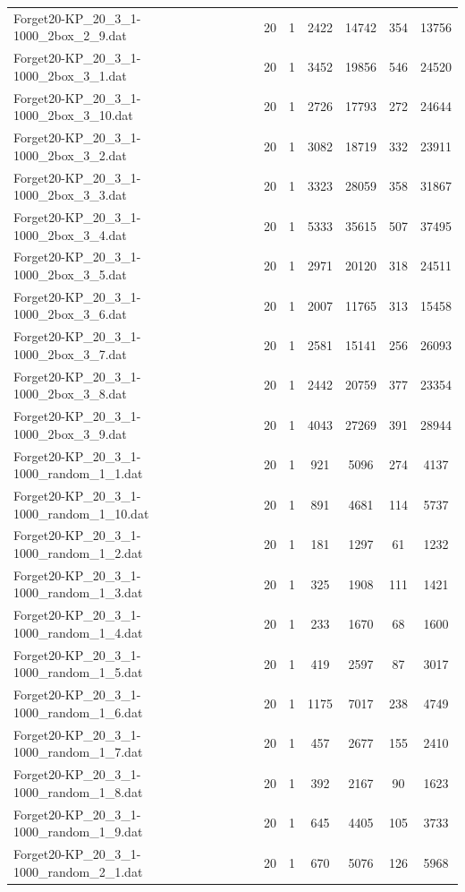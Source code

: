 \begin{table}[!ht]
\begin{tabular}{lcccccc}
Forget20-KP\_20\_3\_1-1000\_2box\_2\_9.dat & 20 & 1 & 2422 & 14742 & 354 & 13756 \\
Forget20-KP\_20\_3\_1-1000\_2box\_3\_1.dat & 20 & 1 & 3452 & 19856 & 546 & 24520 \\
Forget20-KP\_20\_3\_1-1000\_2box\_3\_10.dat & 20 & 1 & 2726 & 17793 & 272 & 24644 \\
Forget20-KP\_20\_3\_1-1000\_2box\_3\_2.dat & 20 & 1 & 3082 & 18719 & 332 & 23911 \\
Forget20-KP\_20\_3\_1-1000\_2box\_3\_3.dat & 20 & 1 & 3323 & 28059 & 358 & 31867 \\
Forget20-KP\_20\_3\_1-1000\_2box\_3\_4.dat & 20 & 1 & 5333 & 35615 & 507 & 37495 \\
Forget20-KP\_20\_3\_1-1000\_2box\_3\_5.dat & 20 & 1 & 2971 & 20120 & 318 & 24511 \\
Forget20-KP\_20\_3\_1-1000\_2box\_3\_6.dat & 20 & 1 & 2007 & 11765 & 313 & 15458 \\
Forget20-KP\_20\_3\_1-1000\_2box\_3\_7.dat & 20 & 1 & 2581 & 15141 & 256 & 26093 \\
Forget20-KP\_20\_3\_1-1000\_2box\_3\_8.dat & 20 & 1 & 2442 & 20759 & 377 & 23354 \\
Forget20-KP\_20\_3\_1-1000\_2box\_3\_9.dat & 20 & 1 & 4043 & 27269 & 391 & 28944 \\
Forget20-KP\_20\_3\_1-1000\_random\_1\_1.dat & 20 & 1 & 921 & 5096 & 274 & 4137 \\
Forget20-KP\_20\_3\_1-1000\_random\_1\_10.dat & 20 & 1 & 891 & 4681 & 114 & 5737 \\
Forget20-KP\_20\_3\_1-1000\_random\_1\_2.dat & 20 & 1 & 181 & 1297 & 61 & 1232 \\
Forget20-KP\_20\_3\_1-1000\_random\_1\_3.dat & 20 & 1 & 325 & 1908 & 111 & 1421 \\
Forget20-KP\_20\_3\_1-1000\_random\_1\_4.dat & 20 & 1 & 233 & 1670 & 68 & 1600 \\
Forget20-KP\_20\_3\_1-1000\_random\_1\_5.dat & 20 & 1 & 419 & 2597 & 87 & 3017 \\
Forget20-KP\_20\_3\_1-1000\_random\_1\_6.dat & 20 & 1 & 1175 & 7017 & 238 & 4749 \\
Forget20-KP\_20\_3\_1-1000\_random\_1\_7.dat & 20 & 1 & 457 & 2677 & 155 & 2410 \\
Forget20-KP\_20\_3\_1-1000\_random\_1\_8.dat & 20 & 1 & 392 & 2167 & 90 & 1623 \\
Forget20-KP\_20\_3\_1-1000\_random\_1\_9.dat & 20 & 1 & 645 & 4405 & 105 & 3733 \\
Forget20-KP\_20\_3\_1-1000\_random\_2\_1.dat & 20 & 1 & 670 & 5076 & 126 & 5968 \\

\end{tabular}
\end{table}
